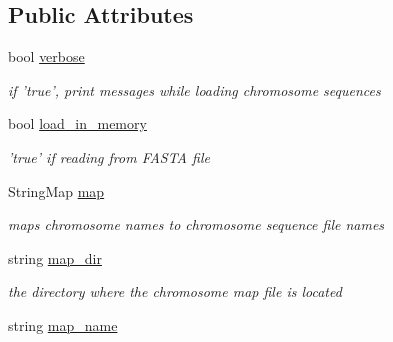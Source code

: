 \subsection*{Public Attributes}
\begin{CompactItemize}
\item 
\hypertarget{classChromosomes_954bae240564f6f589a30d253291eb75}{
bool \hyperlink{classChromosomes_954bae240564f6f589a30d253291eb75}{verbose}}
\label{classChromosomes_954bae240564f6f589a30d253291eb75}

\begin{CompactList}\small\item\em if 'true', print messages while loading chromosome sequences \item\end{CompactList}\item 
\hypertarget{classChromosomes_408a06b9ae635ceaf0b75452bcb62763}{
bool \hyperlink{classChromosomes_408a06b9ae635ceaf0b75452bcb62763}{load\_\-in\_\-memory}}
\label{classChromosomes_408a06b9ae635ceaf0b75452bcb62763}

\begin{CompactList}\small\item\em 'true' if reading from FASTA file \item\end{CompactList}\item 
\hypertarget{classChromosomes_8e40e7c99c6c0a40713c7785ba5b5ac4}{
StringMap \hyperlink{classChromosomes_8e40e7c99c6c0a40713c7785ba5b5ac4}{map}}
\label{classChromosomes_8e40e7c99c6c0a40713c7785ba5b5ac4}

\begin{CompactList}\small\item\em maps chromosome names to chromosome sequence file names \item\end{CompactList}\item 
\hypertarget{classChromosomes_8df459fcb5ad98a2524fd51ac2b5a60c}{
string \hyperlink{classChromosomes_8df459fcb5ad98a2524fd51ac2b5a60c}{map\_\-dir}}
\label{classChromosomes_8df459fcb5ad98a2524fd51ac2b5a60c}

\begin{CompactList}\small\item\em the directory where the chromosome map file is located \item\end{CompactList}\item 
\hypertarget{classChromosomes_9c690f19e04e80b056dac2072476f24c}{
string \hyperlink{classChromosomes_9c690f19e04e80b056dac2072476f24c}{map\_\-name}}
\label{classChromosomes_9c690f19e04e80b056dac2072476f24c}


\end{CompactItemize}
